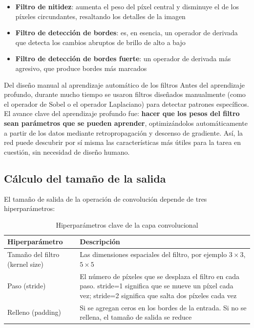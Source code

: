 \begin{itemize}
    \item \textbf{Filtro de nitidez}: aumenta el peso del píxel central y disminuye el de los píxeles circundantes, resaltando los detalles de la imagen
    \item \textbf{Filtro de detección de bordes}: es, en esencia, un operador de derivada que detecta los cambios abruptos de brillo de alto a bajo
    \item \textbf{Filtro de detección de bordes fuerte}: un operador de derivada más agresivo, que produce bordes más marcados
\end{itemize}

\begin{knowledgebox}{Del diseño manual al aprendizaje automático de los filtros}
Antes del aprendizaje profundo, durante mucho tiempo se usaron filtros diseñados manualmente (como el operador de Sobel o el operador Laplaciano) para detectar patrones específicos. El avance clave del aprendizaje profundo fue: \textbf{hacer que los pesos del filtro sean parámetros que se pueden aprender}, optimizándolos automáticamente a partir de los datos mediante retropropagación y descenso de gradiente. Así, la red puede descubrir por sí misma las características más útiles para la tarea en cuestión, sin necesidad de diseño humano.
\end{knowledgebox}

\subsection{Cálculo del tamaño de la salida}

El tamaño de salida de la operación de convolución depende de tres hiperparámetros:

\begin{table}[H]
\centering
\begin{tabular}{lp{10cm}}
\toprule
\textbf{Hiperparámetro} & \textbf{Descripción} \\
\midrule
Tamaño del filtro (kernel size) & Las dimensiones espaciales del filtro, por ejemplo $3 \times 3$, $5 \times 5$ \\
Paso (stride) & El número de píxeles que se desplaza el filtro en cada paso. stride=1 significa que se mueve un píxel cada vez; stride=2 significa que salta dos píxeles cada vez \\
Relleno (padding) & Si se agregan ceros en los bordes de la entrada. Si no se rellena, el tamaño de salida se reduce \\
\bottomrule
\end{tabular}
\caption{Hiperparámetros clave de la capa convolucional}
\end{table}

